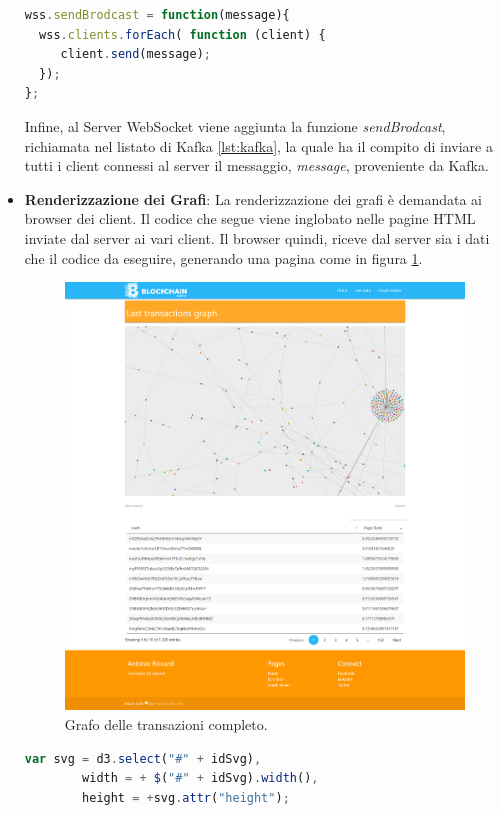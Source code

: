 \begin{itemize}
\begin{lstlisting}[language=Javascript, label=lst:websocket, caption={Creazione di un Server WebSocket.}]
wss.sendBrodcast = function(message){
  wss.clients.forEach( function (client) {
     client.send(message);
  });
};
\end{lstlisting}

Infine, al Server WebSocket viene aggiunta la funzione \textit{sendBrodcast}, richiamata nel listato di Kafka \ref{lst:kafka}, la quale ha il compito di inviare a tutti i client connessi al server il messaggio, \textit{message}, proveniente da Kafka.
\item \textbf{Renderizzazione dei Grafi}: La renderizzazione dei grafi è demandata ai browser dei client. Il codice che segue viene inglobato nelle pagine HTML inviate dal server ai vari client. Il browser quindi, riceve dal server sia i dati che il codice da eseguire, generando una pagina come in figura \ref{fig:graphView}.

\begin{figure}[H]
	\centering
	\includegraphics[width=\textwidth, height=0.65\textheight]{images/graphView.png}
	\caption{Grafo delle transazioni completo.}
	\label{fig:graphView}
\end{figure}

\begin{lstlisting}[language=Javascript, label=lst:intGraph, caption={Inizializzazione svg per il grafo.}]
var svg = d3.select("#" + idSvg),
        width = + $("#" + idSvg).width(),
        height = +svg.attr("height");


\end{lstlisting}
\end{itemize}
